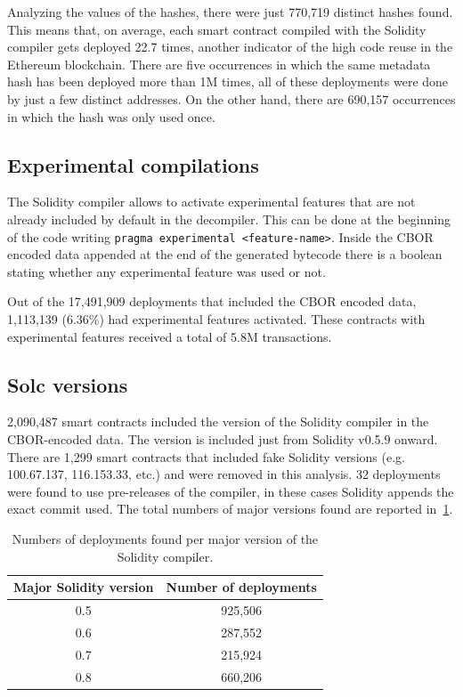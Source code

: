 Analyzing the values of the hashes, there were just 770,719 distinct hashes found. This means that, on average, each smart contract compiled with the Solidity compiler gets deployed 22.7 times, another indicator of the high code reuse in the Ethereum blockchain. There are five occurrences in which the same metadata hash has been deployed more than 1M times, all of these deployments were done by just a few distinct addresses. On the other hand, there are 690,157 occurrences in which the hash was only used once.

\subsection{Experimental compilations}

The Solidity compiler allows to activate experimental features that are not already included by default in the decompiler. This can be done at the beginning of the code writing {\tt pragma experimental <feature-name>}. Inside the CBOR encoded data appended at the end of the generated bytecode there is a boolean stating whether any experimental feature was used or not.

Out of the 17,491,909 deployments that included the CBOR encoded data, 1,113,139 (6.36\%) had experimental features activated. These contracts with experimental features received a total of 5.8M transactions.

\subsection{Solc versions}

2,090,487 smart contracts included the version of the Solidity compiler in the CBOR-encoded data. The version is included just from Solidity v0.5.9 onward. There are 1,299 smart contracts that included fake Solidity versions (e.g. 100.67.137, 116.153.33, etc.) and were removed in this analysis. 32 deployments were found to use pre-releases of the compiler, in these cases Solidity appends the exact commit used. The total numbers of major versions found are reported in~\cref{table:solc-majors}.

\begin{table}[ht]
\centering
    \begin{threeparttable}
    \begin{tabular}{ c c } 
    \toprule
    \textbf{Major Solidity version} & \textbf{Number of deployments} \\
    \midrule
       0.5 & 925,506 \\ [1.2ex]
       0.6 & 287,552 \\ [1.2ex]
       0.7 & 215,924 \\ [1.2ex]
       0.8 & 660,206 \\ [1.2ex]
    \bottomrule
    \end{tabular}
    \end{threeparttable}
    \caption{Numbers of deployments found per major version of the Solidity compiler.}
    \label{table:solc-majors}
\end{table}

